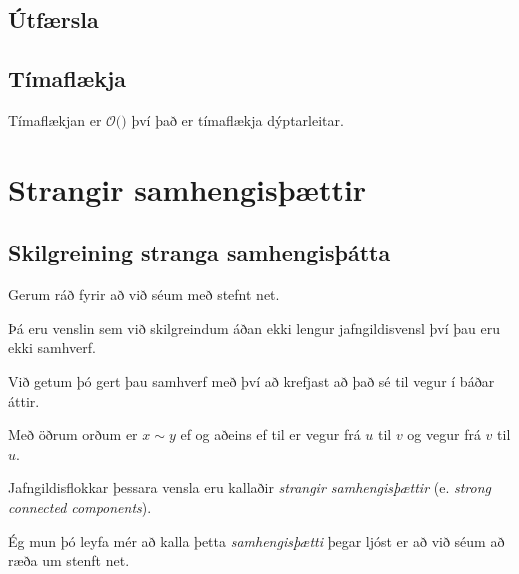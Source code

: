 \subsection{Útfærsla}
{
}

\subsection{Tímaflækja}
{
    {
        \item<1-> Tímaflækjan er $\mathcal{O}($$)$ því það er tímaflækja dýptarleitar.
    }
}

\section{Strangir samhengisþættir}
\subsection{Skilgreining stranga samhengisþátta}
{
    {
        \item<1-> Gerum ráð fyrir að við séum með stefnt net.
        \item<2-> Þá eru venslin sem við skilgreindum áðan ekki lengur jafngildisvensl því þau eru ekki samhverf.
        \item<3-> Við getum þó gert þau samhverf með því að krefjast að það sé til vegur í báðar áttir.
        \item<4-> Með öðrum orðum er $x \sim y$ ef og aðeins ef til er vegur frá $u$ til $v$ og vegur frá $v$ til $u$.
        \item<5-> Jafngildisflokkar þessara vensla eru kallaðir \emph{strangir samhengisþættir} (e. \emph{strong connected components}).
        \item<6-> Ég mun þó leyfa mér að kalla þetta \emph{samhengisþætti} þegar ljóst er að við séum að ræða um stenft net.
    }
}

